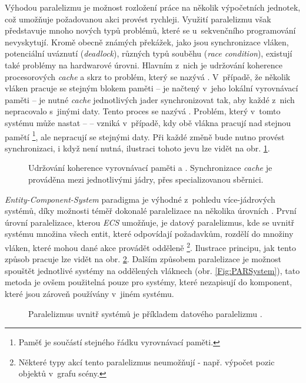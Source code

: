 Výhodou paralelizmu je možnost rozložení práce na několik výpočetních jednotek, což umožňuje požadovanou akci provést rychleji. Využití paralelizmu však představuje mnoho nových typů problémů, které se u~sekvenčního programování nevyskytují. Kromě obecně známých překážek, jako jsou synchronizace vláken, potenciální uváznutí (\emph{deadlock}), různých typů souběhu (\emph{race condition}), existují také problémy na hardwarové úrovni. Hlavním z~nich je udržování koherence procesorových \emph{cache} \cite{CacheCoherence} a skrz to problém, který se nazývá  \cite{FalseSharing}. V~případě, že několik vláken pracuje se stejným blokem paměti -- je načtený v~jeho lokální vyrovnávací paměti -- je nutné \emph{cache} jednotlivých jader synchronizovat tak, aby každé z~nich nepracovalo s~jinými daty. Tento proces se nazývá . Problém, který v~tomto systému může nastat --  -- vzniká v~případě, kdy obě vlákna pracují nad stejnou pamětí \footnote{Paměť je součástí stejného řádku vyrovnávací paměti.}, ale nepracují se stejnými daty. Při každé změně bude nutno provést synchronizaci, i když není nutná, ilustraci tohoto jevu lze vidět na obr. \ref{Fig:PARFalseSharing}.

\begin{figure}
	\caption{Udržování koherence vyrovnávací paměti a  \cite{FalseSharing}. Synchronizace \emph{cache} je prováděna mezi jednotlivými jádry, přes specializovanou sběrnici.}
	\label{Fig:PARFalseSharing}
\end{figure}

\emph{Entity-Component-System} paradigma je výhodné z~pohledu více-jádrových systémů, díky možnosti téměř \cite{AmdahlLaw} dokonalé paralelizace na několika úrovních \cite{ParallelGame}. První úrovní paralelizace, kterou \emph{ECS} umožňuje, je datový paralelizmus, kde se uvnitř systému množina všech entit, které odpovídají požadavkům, rozdělí do množiny vláken, které mohou dané akce provádět odděleně \footnote{Některé typy akcí tento paralelizmus neumožňují - např. výpočet pozic objektů v~grafu scény.}. Ilustrace principu, jak tento způsob pracuje lze vidět na obr. \ref{Fig:PARData}. Dalším způsobem paralelizace je možnost spouštět jednotlivé systémy na oddělených vláknech (obr. \ref{Fig:PARSystem}), tato metoda je ovšem použitelná pouze pro systémy, které nezapisují do komponent, které jsou zároveň používány v~jiném systému. 

\begin{figure}
	\caption{Paralelizmus uvnitř systémů je příkladem datového paralelizmu \cite{KindsOfParallelism}.}
	\label{Fig:PARData}
\end{figure}

